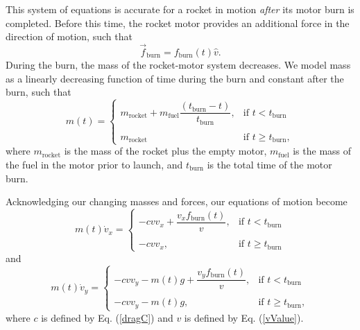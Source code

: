 \documentclass[aps,pra,twocolumn]{revtex4-1}
\begin{document}
This system of equations is accurate for a rocket in motion \emph{after} its motor burn is completed.  Before this time, the rocket motor provides an additional force in the direction of motion, such that
\begin{equation}
\vec{f}_\text{burn} = f_\text{burn}(t) \hat{v}.
\end{equation}
During the burn, the mass of the rocket-motor system decreases.  We model mass as a linearly decreasing function of time during the burn and constant after the burn, such that 
\begin{equation}
m(t) = 
\begin{cases}
m_\text{rocket} + m_\text{fuel}\dfrac{(t_\text{burn} - t)}{t_\text{burn}}, & \text{if } t < t_\text{burn} \\ \\
m_\text{rocket} & \text{if } t \geq t_\text{burn},
\end{cases}
\end{equation}
where $m_\text{rocket}$ is the mass of the rocket plus the empty motor, $m_\text{fuel}$ is the mass of the fuel in the motor prior to launch, and $t_\text{burn}$ is the total time of the motor burn.

Acknowledging our changing masses and forces, our equations of motion become
\begin{equation}
m(t) \dot{v}_x = 
\begin{cases}
-c v v_x +  \dfrac{v_x f_\text{burn}(t)}{ v }, & \text{if } t < t_\text{burn} \\ \\
-c v v_x, & \text{if } t \geq t_\text{burn}
\label{xmotion}
\end{cases}
\end{equation}
and
\begin{equation}
m(t) \dot{v}_y = 
\begin{cases}
-c v v_y  - m(t) g+  \dfrac{v_y f_\text{burn}(t)}{ v }, & \text{if } t < t_\text{burn} \\ \\
-c v v_y - m(t) g, & \text{if } t \geq t_\text{burn},
\label{ymotion}
\end{cases}
\end{equation}
where $c$ is defined by Eq. (\ref{dragC}) and $v$ is defined by Eq. (\ref{vValue}). 
\end{document}
